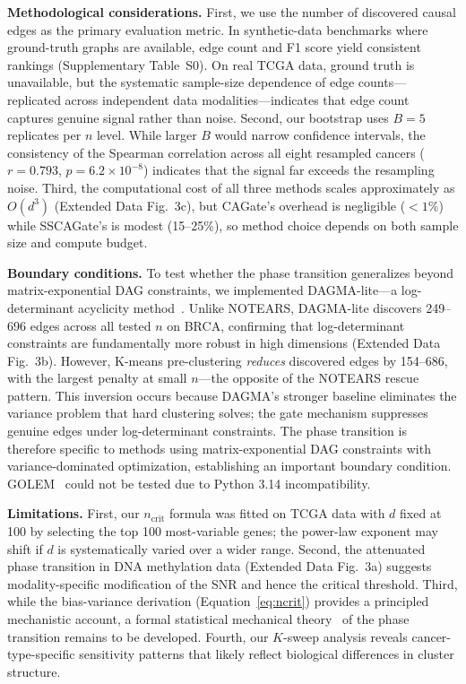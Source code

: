 \documentclass[12pt,a4paper]{article}
\begin{document}
\textbf{Methodological considerations.} First, we use the number of discovered causal edges as the primary evaluation metric. In synthetic-data benchmarks where ground-truth graphs are available, edge count and F1 score yield consistent rankings (Supplementary Table~S0). On real TCGA data, ground truth is unavailable, but the systematic sample-size dependence of edge counts---replicated across independent data modalities---indicates that edge count captures genuine signal rather than noise. Second, our bootstrap uses $B = 5$ replicates per $n$ level. While larger $B$ would narrow confidence intervals, the consistency of the Spearman correlation across all eight resampled cancers ($r = 0.793$, $p = 6.2 \times 10^{-8}$) indicates that the signal far exceeds the resampling noise. Third, the computational cost of all three methods scales approximately as $O(d^3)$ (Extended Data Fig.~3c), but CAGate's overhead is negligible ($< 1$\%) while SSCAGate's is modest (15--25\%), so method choice depends on both sample size and compute budget.

\textbf{Boundary conditions.} To test whether the phase transition generalizes beyond matrix-exponential DAG constraints, we implemented DAGMA-lite---a log-determinant acyclicity method~\cite{bello2022dagma}. Unlike NOTEARS, DAGMA-lite discovers 249--696 edges across all tested $n$ on BRCA, confirming that log-determinant constraints are fundamentally more robust in high dimensions (Extended Data Fig.~3b). However, K-means pre-clustering \emph{reduces} discovered edges by 154--686, with the largest penalty at small $n$---the opposite of the NOTEARS rescue pattern. This inversion occurs because DAGMA's stronger baseline eliminates the variance problem that hard clustering solves; the gate mechanism suppresses genuine edges under log-determinant constraints. The phase transition is therefore specific to methods using matrix-exponential DAG constraints with variance-dominated optimization, establishing an important boundary condition. GOLEM~\cite{ng2020golem} could not be tested due to Python 3.14 incompatibility.

\textbf{Limitations.} First, our $n_{\text{crit}}$ formula was fitted on TCGA data with $d$ fixed at 100 by selecting the top 100 most-variable genes; the power-law exponent may shift if $d$ is systematically varied over a wider range. Second, the attenuated phase transition in DNA methylation data (Extended Data Fig.~3a) suggests modality-specific modification of the SNR and hence the critical threshold. Third, while the bias-variance derivation (Equation~\ref{eq:ncrit}) provides a principled mechanistic account, a formal statistical mechanical theory~\cite{stanley1971phase} of the phase transition remains to be developed. Fourth, our $K$-sweep analysis reveals cancer-type-specific sensitivity patterns that likely reflect biological differences in cluster structure.
\end{document}
